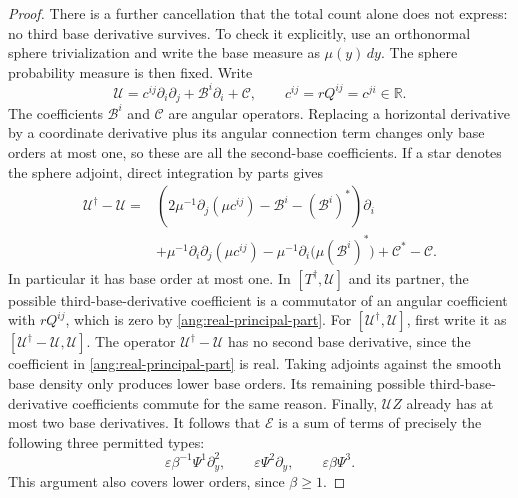 \begin{proof}
There is a further cancellation that the total count alone does not
express: no third base derivative survives.  To check it explicitly,
use an orthonormal sphere trivialization and write the base measure as
$\mu(y)\,dy$.  The sphere probability measure is then fixed.  Write
\[
 \mathcal U=c^{ij}\partial_i\partial_j+\mathcal B^i\partial_i+\mathcal C,
 \qquad c^{ij}=rQ^{ij}=c^{ji}\in\mathbb R.
\]
The coefficients $\mathcal B^i$ and $\mathcal C$ are angular
operators.  Replacing a horizontal derivative by a coordinate derivative
plus its angular connection term changes only base orders at most one,
so these are all the second-base coefficients.  If a star denotes the
sphere adjoint, direct integration by parts gives
\begin{align*}
 \mathcal U^\dagger-\mathcal U
 ={}&\left(2\mu^{-1}\partial_j(\mu c^{ij})
                -\mathcal B^i-(\mathcal B^i)^*\right)\partial_i\\
 &+\mu^{-1}\partial_i\partial_j(\mu c^{ij})
       -\mu^{-1}\partial_i\bigl(\mu(\mathcal B^i)^*\bigr)
       +\mathcal C^*-\mathcal C.
\end{align*}
In particular it has base order at most one.
In $[T^\dagger,\mathcal U]$ and
its partner, the possible third-base-derivative coefficient is a commutator of an angular coefficient
with $rQ^{ij}$, which is zero by
\eqref{ang:real-principal-part}.  For $[\mathcal U^\dagger,\mathcal U]$, first write
it as $[\mathcal U^\dagger-\mathcal U,\mathcal U]$.  The operator $\mathcal U^\dagger-\mathcal U$ has no second base
derivative, since the coefficient in
\eqref{ang:real-principal-part} is real.  Taking adjoints against
the smooth base density only produces lower base orders.  Its remaining
possible third-base-derivative coefficients commute for the same reason.
Finally, $\mathcal U Z$ already has at most two base derivatives.
It follows that $\mathcal E$ is a sum of terms of precisely the following
three permitted types:
\begin{equation}\label{ang:error-types}
 \varepsilon\beta^{-1}\Psi^1\partial_y^2,
 \qquad \varepsilon\Psi^2\partial_y,
 \qquad \varepsilon\beta\Psi^3.
\end{equation}
This argument also covers lower orders, since $\beta\ge1$.


\end{proof}
